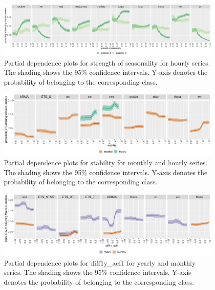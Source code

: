 \documentclass[11pt,a4paper,]{article}
\begin{document}
\begin{figure}[h]

{\centering \includegraphics[width=\textwidth]{figure/seasonalityhourly-1} 

}

\caption{Partial dependence plots for strength of seasonality for hourly series. The shading shows the 95\% confidence intervals. Y-axis denotes the probability of belonging to the corresponding class.}\label{fig:seasonalityhourly}
\end{figure}

\begin{figure}[h]

{\centering \includegraphics[width=\textwidth]{figure/pdpmonthlyhourlyStability-1} 

}

\caption{Partial dependence plots for stability for monthly and hourly series. The shading shows the 95\% confidence intervals. Y-axis denotes the probability of belonging to the corresponding class.}\label{fig:pdpmonthlyhourlyStability}
\end{figure}

\begin{figure}[h]

{\centering \includegraphics[width=\textwidth]{figure/diff1yacf1-1} 

}

\caption{Partial dependence plots for diff1y\_acf1 for yearly and monthly series. The shading shows the 95\% confidence intervals. Y-axis denotes the probability of belonging to the corresponding class.}\label{fig:diff1yacf1}
\end{figure}
\end{document}
